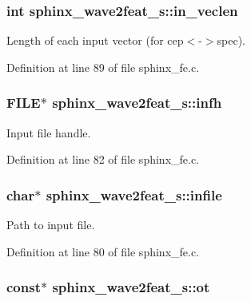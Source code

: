 \subsubsection[{in\+\_\+veclen}]{\setlength{\rightskip}{0pt plus 5cm}int sphinx\+\_\+wave2feat\+\_\+s\+::in\+\_\+veclen}\label{structsphinx__wave2feat__s_a3410a9e0c05c0057f31452550fb5380a}


Length of each input vector (for cep$<$-\/$>$spec). 



Definition at line 89 of file sphinx\+\_\+fe.\+c.

\subsubsection[{infh}]{\setlength{\rightskip}{0pt plus 5cm}F\+I\+L\+E$\ast$ sphinx\+\_\+wave2feat\+\_\+s\+::infh}\label{structsphinx__wave2feat__s_ad86834e597d4677aed93e7c06cebccb7}


Input file handle. 



Definition at line 82 of file sphinx\+\_\+fe.\+c.

\subsubsection[{infile}]{\setlength{\rightskip}{0pt plus 5cm}char$\ast$ sphinx\+\_\+wave2feat\+\_\+s\+::infile}\label{structsphinx__wave2feat__s_a6d4d1b1be4e3a3c1de82943e9e6fa65c}


Path to input file. 



Definition at line 80 of file sphinx\+\_\+fe.\+c.

\subsubsection[{ot}]{ const$\ast$ sphinx\+\_\+wave2feat\+\_\+s\+::ot}\label{structsphinx__wave2feat__s_a929e05e041ad922f6a2e35637a98c917}


